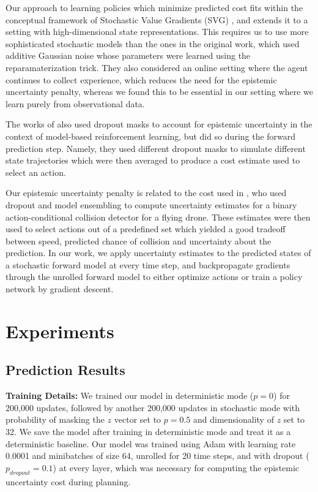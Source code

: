 \documentclass{article} %
\begin{document}
Our approach to learning policies which minimize predicted cost fits within the conceptual framework of Stochastic Value Gradients (SVG) \citep{SVG}, and extends it to a setting with high-dimensional state representations.
This requires us to use more sophisticated stochastic models than the ones in the original work, which used additive Gaussian noise whose parameters were learned using the reparamaterization trick.
They also considered an online setting where the agent continues to collect experience, which reduces the need for the epistemic uncertainty penalty, whereas we found this to be essential in our setting where we learn purely from observational data.

The works of \citep{DeepPilco, Chua2018} also used dropout masks to account for epistemic uncertainty in the context of model-based reinforcement learning, but did so during the forward prediction step. Namely, they used different dropout masks to simulate different state trajectories which were then averaged to produce a cost estimate used to select an action.

Our epistemic uncertainty penalty is related to the cost used in \citep{Kahn2017}, who used dropout and model ensembling to compute uncertainty estimates for a binary action-conditional collision detector for a flying drone. These estimates were then used to select actions out of a predefined set which yielded a good tradeoff between speed, predicted chance of collision and uncertainty about the prediction. In our work, we apply uncertainty estimates to the predicted states of a stochastic forward model at every time step, and backpropagate gradients through the unrolled forward model to either optimize actions or train a policy network by gradient descent.




    \section{Experiments}

    \subsection{Prediction Results}

    \textbf{Training Details:} We trained our model in deterministic mode ($p=0$) for 200,000 updates, followed by another 200,000 updates in stochastic mode with probability of masking the $z$ vector set to $p=0.5$ and dimensionality of $z$ set to 32.
    We save the model after training in deterministic mode and treat it as a deterministic baseline.
    Our model was trained using Adam \citep{ADAM} with learning rate 0.0001 and minibatches of size 64, unrolled for 20 time steps, and with dropout ($p_{dropout}=0.1$) at every layer, which was necessary for computing the epistemic uncertainty cost during planning.
\end{document}
